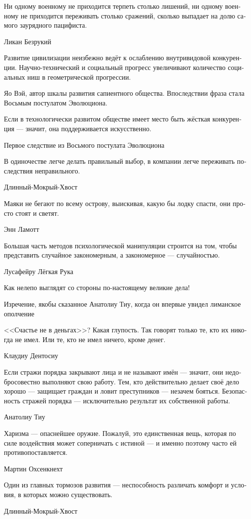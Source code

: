 \documentclass[a4paper,12pt,fleqn]{book}\usepackage{polyglossia}\setdefaultlanguage[babelshorthands=true]{russian}\setotherlanguage{english}\defaultfontfeatures{Ligatures=TeX,Mapping=tex-text}\usepackage{xcolor}\newcommand{\ml}[3]{#2}
\begin{document}
{\epigraph
{Ни одному военному не приходится терпеть столько лишений, ни одному военному не приходится переживать столько сражений, сколько выпадает на долю самого заурядного пацифиста.}
{Ликан Безрукий}

\epigraph
{Развитие цивилизации неизбежно ведёт к ослаблению внутривидовой конкуренции.
Научно-технический и социальный прогресс увеличивают количество социальных ниш в геометрической прогрессии.}
{Яо Вэй, автор шкалы развития сапиентного общества.
Впоследствии фраза стала Восьмым постулатом Эволюциона.}

\epigraph{Если в технологически развитом обществе имеет место быть жёсткая конкуренция --- значит, она поддерживается искусственно.}
{Первое следствие из Восьмого постулата Эволюциона}

\epigraph
{В одиночестве легче делать правильный выбор, в компании легче переживать последствия неправильного.}
{Длинный-Мокрый-Хвост}

\epigraph
{Маяки не бегают по всему острову, выискивая, какую бы лодку спасти, они просто стоят и светят.}
{Энн Ламотт}

\epigraph{
\ml{$0$}
{Большая часть методов психологической манипуляции строится на том, чтобы представить случайное закономерным, а закономерное --- случайностью.}
{Most of methods of psychological manipulation are based on the idea to make random look logical, and or make logical look random.}
}{Лусафейру Лёгкая Рука}

\epigraph
{Как нелепо выглядят со стороны по-настоящему великие дела!}
{Изречение, якобы сказанное Анатолиу Тиу, когда он впервые увидел лиманское ополчение}

\epigraph
{<<Счастье не в деньгах>>?
Какая глупость.
Так говорят только те, кто их никогда не имел.
Или те, кто не имел ничего, кроме денег.}
{Клаудиу Дентосиу}

\epigraph
{Если стражи порядка закрывают лица и не называют имён --- значит, они недобросовестно выполняют свою работу.
Тем, кто действительно делает своё дело хорошо --- защищает граждан и ловит преступников --- незачем бояться.
Безопасность стражей порядка --- исключительно результат их собственной работы.}
{Анатолиу Тиу}

\epigraph
{Харизма --- опаснейшее оружие.
Пожалуй, это единственная вещь, которая по силе воздействия может соперничать с истиной --- и именно поэтому часто ей противопоставляется.}
{Мартин Охсенкнехт}

\epigraph{
\ml{$0$}
{Один из главных тормозов развития --- неспособность различать комфорт и условия, в которых можно существовать.}
{One of main hindrance to development is inability to distinguish between comfort and possibility to live.}
}{Длинный-Мокрый-Хвост}

}
\end{document}
